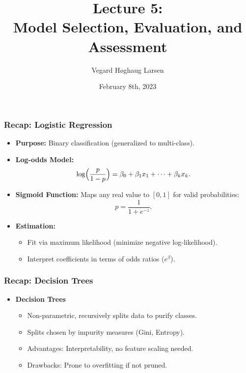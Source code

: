 \documentclass[aspectratio=169]{beamer}
\title{Lecture 5:\\ Model Selection, Evaluation, and Assessment}
\institute{GRA4160: Predictive Modelling with Machine Learning}
\date{February 8th, 2023}
\author{Vegard H\o ghaug Larsen}
\begin{document}
\maketitle


\begin{frame}
\frametitle{Recap: Logistic Regression}
\begin{itemize}
    \item \textbf{Purpose:} Binary classification (generalized to multi-class).
    \item \textbf{Log-odds Model:} 
    \[
      \log\Bigl(\frac{p}{1-p}\Bigr) = \beta_0 + \beta_1 x_1 + \cdots + \beta_k x_k.
    \]
    \item \textbf{Sigmoid Function:} Maps any real value to \([0,1]\) for valid probabilities:
    \[
      p = \frac{1}{1 + e^{-z}}.
    \]
    \item \textbf{Estimation:} 
      \begin{itemize}
        \item Fit via maximum likelihood (minimize negative log-likelihood).
        \item Interpret coefficients in terms of odds ratios (\(e^\beta\)).
      \end{itemize}
\end{itemize}
\end{frame}


\begin{frame}
\frametitle{Recap: Decision Trees}
\begin{itemize}
    \item \textbf{Decision Trees}
    \begin{itemize}
        \item Non-parametric, recursively splits data to purify classes.
        \item Splits chosen by impurity measures (Gini, Entropy).
        \item Advantages: Interpretability, no feature scaling needed.
        \item Drawbacks: Prone to overfitting if not pruned.
    \end{itemize}
\end{itemize}
\end{frame}
\end{document}
